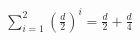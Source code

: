 \documentclass[preview]{standalone}
\begin{document}
\begin{align*}
\sum_{i=1}^{2} \left(\frac{d}{2}\right)^i =\frac{d}{2} + \frac{d}{4}
\end{align*}
\end{document}

